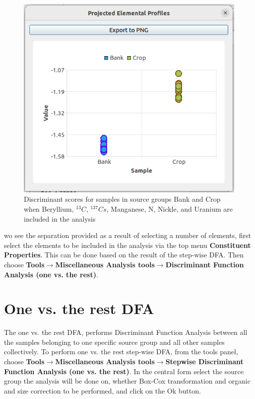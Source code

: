 \documentclass[12pt]{report}
\begin{document}
\begin{figure}[ht]
    \centering
    \includegraphics[width=14cm]{Figures/DFA_Scatter_2way.png}
    \caption{Discriminant scores for samples in source groups Bank and Crop when Beryllium, $^{13}C$,  $^{137}Cs$, Manganese, N, Nickle, and Uranium are included in the analysis}
    \label{fig:two-way-DFA-scatter}
\end{figure}
\FloatBarrier

wo see the separation provided as a result of selecting a number of elements, first select the elements to be included in the analysis via the top menu \textbf{Constituent Properties}. This can be done based on the result of the step-wise DFA. Then choose \textbf{Tools}$\rightarrow$\textbf{Miscellaneous Analysis tools}$\rightarrow$\textbf{Discriminant Function Analysis (one vs. the rest)}. 

\section{One vs. the rest DFA}
The one vs. the rest DFA, performs Discriminant Function Analysis between all the samples belonging to one specific source group and all other samples collectively. To perform one vs. the rest step-wise DFA, from the tools panel, choose \textbf{Tools}$\rightarrow$\textbf{Miscellaneous Analysis tools}$\rightarrow$\textbf{Stepwise Discriminant Function Analysis (one vs. the rest)}. In the central form select the source group the analysis will be done on, whether Box-Cox transformation and organic and size correction to be performed, and click on the Ok button. 
\end{document}
